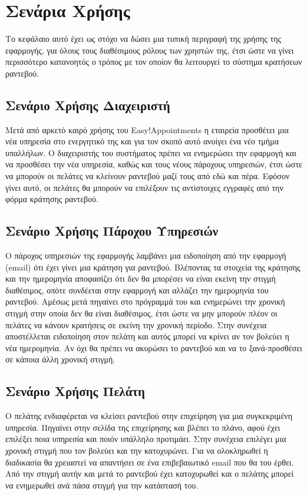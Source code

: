 
\chapter{Σενάρια Χρήσης}
Το κεφάλαιο αυτό έχει ως στόχο να δώσει μια τυπική περιγραφή της χρήσης της εφαρμογής, για όλους τους διαθέσιμους ρόλους των χρηστών της, έτσι ώστε να γίνει περισσότερο κατανοητός ο τρόπος με τον οποίον θα λειτουργεί το σύστημα κρατήσεων ραντεβού.

\section{Σενάριο Χρήσης Διαχειριστή}
Μετά από αρκετό καιρό χρήσης του Easy!Appointments η εταιρεία προσθέτει μια νέα υπηρεσία στο ενεργητικό της και για τον σκοπό αυτό ανοίγει ένα νέο τμήμα υπαλλήλων. Ο διαχειριστής του συστήματος πρέπει να ενημερώσει την εφαρμογή και να προσθέσει την νέα υπηρεσία, καθώς και τους νέους πάροχους υπηρεσιών, έτσι ώστε να μπορούν οι πελάτες να κλείνουν ραντεβού μαζί τους από εδώ και πέρα. Εφόσον γίνει αυτό, οι πελάτες θα μπορούν να επιλέξουν τις αντίστοιχες εγγραφές από την φόρμα κράτησης ραντεβού.

\section{Σενάριο Χρήσης Πάροχου Υπηρεσιών}
Ο πάροχος υπηρεσιών της εφαρμογής λαμβάνει μια ειδοποίηση από την εφαρμογή (email) ότι έχει γίνει μια κράτηση για ραντεβού. Βλέποντας τα στοιχεία της κράτησης και την ημερομηνία αποφασίζει ότι δεν θα μπορέσει να είναι εκείνη την στιγμή διαθέσιμος, οπότε συνδέεται στην εφαρμογή και αλλάζει την ημερομηνία του ραντεβού. Αμέσως μετά πηγαίνει στο πρόγραμμά του και ενημερώνει την χρονική στιγμή στην οποία δεν θα είναι διαθέσιμος, έτσι ώστε να μην μπορούν πλέον οι πελάτες να κάνουν κρατήσεις σε εκείνη την χρονική περίοδο. Στην συνέχεια αποστέλλεται ειδοποίηση στον πελάτη και αυτός μπορεί να κρίνει αν τον βολεύει η νέα ημερομηνία. Αν όχι θα πρέπει να ακυρώσει το ραντεβού και να το ξανά-προσθέσει σε κάποια άλλη χρονική στιγμή. 

\section{Σενάριο Χρήσης Πελάτη}
Ο πελάτης ενδιαφέρεται να κλείσει ραντεβού στην επιχείρηση για μια συγκεκριμένη υπηρεσία. Πηγαίνει στην σελίδα της επιχείρησης και βλέπει το πλάνο, αφού έχει επιλέξει ποια υπηρεσία και ποιόν υπάλληλο προτιμάει. Στην συνέχεια επιλέγει μια χρονική στιγμή που τον βολεύει και την κατοχυρώνει. Για να ολοκληρωθεί η διαδικασία θα χρειαστεί να απαντήσει σε ένα επιβεβαιωτικό email που θα του έρθει. Από την στιγμή αυτήν και μετά το ραντεβού έχει κατοχυρωθεί και ο πελάτης μπορεί να ενημερωθεί ανά πάσα στιγμή για την κατάστασή του.

